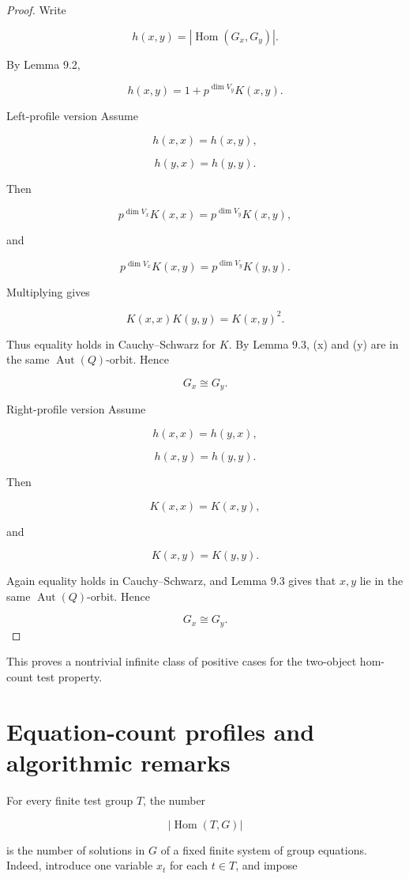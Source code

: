\documentclass[11pt]{article}
\begin{document}
\begin{proof}
Write

\[
h(x,y)=|\operatorname{Hom}(G_x,G_y)|.
\]

By Lemma 9.2,

\[
h(x,y)=1+p^{\dim V_y}K(x,y).
\]

Left-profile version Assume

\[
h(x,x)=h(x,y),
\]

\[
h(y,x)=h(y,y).
\]

Then

\[
p^{\dim V_x}K(x,x)
=p^{\dim V_y}K(x,y),
\]

and

\[
p^{\dim V_x}K(x,y)
=p^{\dim V_y}K(y,y).
\]

Multiplying gives

\[
K(x,x)K(y,y)=K(x,y)^2.
\]

Thus equality holds in Cauchy--Schwarz for $K$. By Lemma 9.3, (x) and (y) are in the same $\operatorname{Aut}(Q)$-orbit. Hence

\[
G_x\cong G_y.
\]

Right-profile version Assume

\[
h(x,x)=h(y,x),
\]

\[
h(x,y)=h(y,y).
\]

Then

\[
K(x,x)=K(x,y),
\]

and

\[
K(x,y)=K(y,y).
\]

Again equality holds in Cauchy--Schwarz, and Lemma 9.3 gives that $x,y$ lie in the same $\operatorname{Aut}(Q)$-orbit. Hence

\[
G_x\cong G_y.
\]

\end{proof}

This proves a nontrivial infinite class of positive cases for the two-object hom-count test property.

\section{Equation-count profiles and algorithmic remarks}

For every finite test group $T$, the number

\[
|\operatorname{Hom}(T,G)|
\]

is the number of solutions in $G$ of a fixed finite system of group equations. Indeed, introduce one variable $x_t$ for each $t\in T$, and impose
\end{document}
